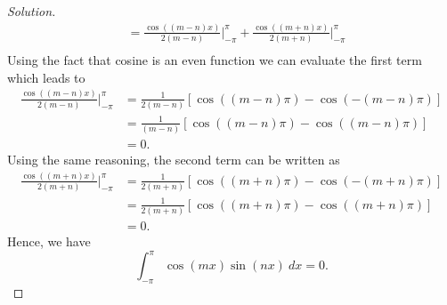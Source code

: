 \begin{enumerate}
\begin{proof}[Solution]
\begin{align*}
                                                             &=\frac{ \cos((m-n)x) }{ 2(m-n) }  \Big|_{- \pi}^{\pi } + \frac{ \cos((m+n)x) }{ 2(m+n) }  \Big|_{- \pi}^{\pi } \\ 
        \end{align*}
        Using the fact that cosine is an even function we can evaluate the first term which leads to 
        \begin{align*}
            \frac{ \cos((m-n)x) }{ 2(m-n) }  \Big|_{- \pi}^{\pi } &= \frac{ 1 }{ 2(m-n)  } [ \cos((m-n) \pi) - \cos(-(m-n) \pi)] \\
                                                                  &= \frac{ 1 }{ (m-n) } [  \cos((m-n) \pi) - \cos((m-n) \pi) ] \\
                                                                  &= 0.
        \end{align*}
        Using the same reasoning, the second term can be written as 
        \begin{align*}
            \frac{ \cos((m+n)x) }{ 2(m+n) }  \Big|_{- \pi}^{\pi } &= \frac{ 1 }{ 2(m+n)  } [ \cos((m+n) \pi) - \cos(-(m+n) \pi) ] \\
                                                                  &= \frac{ 1 }{ 2(m+n) } [ \cos((m+n)\pi) - \cos((m+n)\pi)] \\
                                                                  &= 0.
        \end{align*}
        Hence, we have
        \[  \int_{ - \pi  }^{ \pi  } \cos(mx) \sin(nx)  \ dx = 0.  \]
        

\end{proof}
\end{enumerate}
